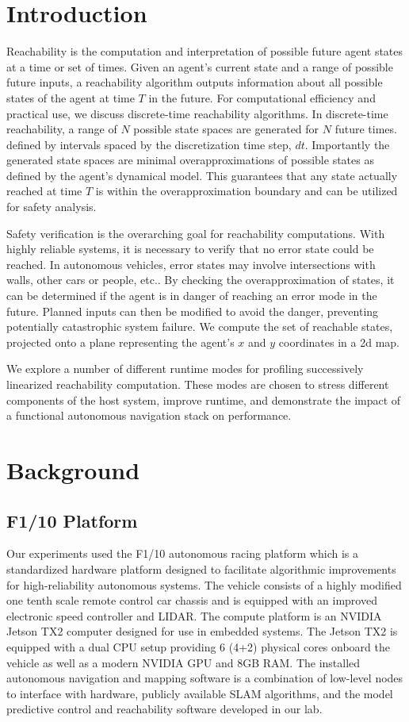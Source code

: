 \documentclass[runningheads]{llncs}
\begin{document}
\section{Introduction}
Reachability is the computation and interpretation of possible future agent states at a time or set of times. Given an agent's current state and a range of possible future inputs, a reachability algorithm outputs information about all possible states of the agent at time $T$ in the future. For computational efficiency and practical use, we discuss discrete-time reachability algorithms. In discrete-time reachability, a range of $N$ possible state spaces are generated for $N$ future times. defined by intervals spaced by the discretization time step, $dt$. Importantly the generated state spaces are minimal overapproximations of possible states as defined by the agent’s dynamical model. This guarantees that any state actually reached at time $T$ is within the overapproximation boundary and can be utilized for safety analysis.

Safety verification is the overarching goal for reachability computations. With highly reliable systems, it is necessary to verify that no error state could be reached. In autonomous vehicles, error states may involve intersections with walls, other cars or people, etc.. By checking the overapproximation of states, it can be determined if the agent is in danger of reaching an error mode in the future. Planned inputs can then be modified to avoid the danger, preventing potentially catastrophic system failure. We compute the set of reachable states, projected onto a plane representing the agent's $x$ and $y$ coordinates in a 2d map.

We explore a number of different runtime modes for profiling successively linearized reachability computation. These modes are chosen to stress different components of the host system, improve runtime, and demonstrate the impact of a functional autonomous navigation stack on performance.

\section{Background}
\subsection{F1/10 Platform}
Our experiments used the F1/10 autonomous racing platform which is a standardized hardware platform designed to facilitate algorithmic improvements for high-reliability autonomous systems. The vehicle consists of a highly modified one tenth scale remote control car chassis and is equipped with an improved electronic speed controller and LIDAR. The compute platform is an NVIDIA Jetson TX2 computer designed for use in embedded systems. The Jetson TX2 is equipped with a dual CPU setup providing 6 (4+2) physical cores onboard the vehicle as well as a modern NVIDIA GPU and 8GB RAM. The installed autonomous navigation and mapping software is a combination of low-level nodes to interface with hardware, publicly available SLAM algorithms, and the model predictive control and reachability software developed in our lab.
\end{document}
